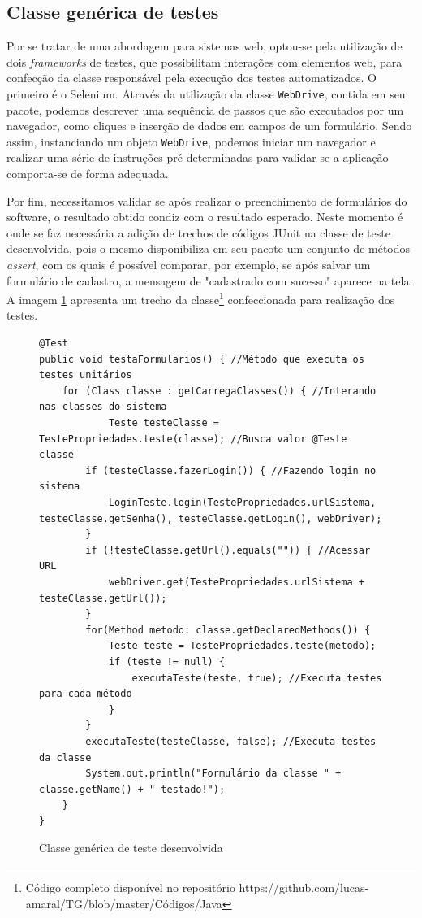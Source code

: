 \documentclass[tg]{mdtufsm}
\begin{document}
\subsection{Classe genérica de testes}
Por se tratar de uma abordagem para sistemas web, optou-se pela utilização de dois \emph{frameworks} de testes, que possibilitam interações com elementos web, para confecção da classe responsável pela execução dos testes automatizados.
O primeiro é o Selenium. Através da utilização da classe \texttt{WebDrive}, contida em seu pacote, podemos descrever uma sequência de passos que são executados por um navegador, como cliques e inserção de dados em campos de um
formulário. Sendo assim, instanciando um objeto \texttt{WebDrive}, podemos iniciar um navegador e realizar uma série de instruções pré-determinadas para validar se a aplicação comporta-se de forma adequada.

Por fim, necessitamos validar se após realizar o preenchimento de formulários do software, o resultado obtido condiz com o resultado esperado. Neste momento é onde se faz necessária a adição de trechos de códigos JUnit na classe de teste
desenvolvida, pois o mesmo disponibiliza em seu pacote um conjunto de métodos \emph{assert}, com os quais é possível comparar, por exemplo, se após salvar um formulário de cadastro, a mensagem de "cadastrado com sucesso" aparece na tela.
A imagem \ref{code:TestaFormularios.java} apresenta um trecho da classe\footnote{Código completo disponível no repositório https://github.com/lucas-amaral/TG/blob/master/Códigos/Java} confeccionada para realização dos testes.

\begin{figure}[!htb]
\begin{lstlisting}
@Test
public void testaFormularios() { //Método que executa os testes unitários
	for (Class classe : getCarregaClasses()) { //Interando nas classes do sistema
    		Teste testeClasse = TestePropriedades.teste(classe); //Busca valor @Teste classe
        if (testeClasse.fazerLogin()) { //Fazendo login no sistema
            LoginTeste.login(TestePropriedades.urlSistema, testeClasse.getSenha(), testeClasse.getLogin(), webDriver);
        }
        if (!testeClasse.getUrl().equals("")) { //Acessar URL
            webDriver.get(TestePropriedades.urlSistema + testeClasse.getUrl());
        }
        for(Method metodo: classe.getDeclaredMethods()) {
            Teste teste = TestePropriedades.teste(metodo);
            if (teste != null) {
                executaTeste(teste, true); //Executa testes para cada método
            }
        }
        executaTeste(testeClasse, false); //Executa testes da classe
        System.out.println("Formulário da classe " + classe.getName() + " testado!");
	}
}
\end{lstlisting}
    \caption{Classe genérica de teste desenvolvida}
	\label{code:TestaFormularios.java}
\end{figure}
\end{document}
